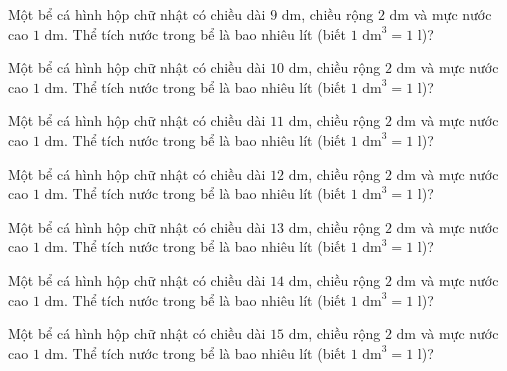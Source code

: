 \begin{ex}
  Một bể cá hình hộp chữ nhật có chiều dài $9\text{ dm}$, chiều rộng $2\text{ dm}$ và mực nước cao $1\text{ dm}$. Thể tích nước trong bể là bao nhiêu lít (biết $1\text{ dm}^3 = 1\text{ l}$)?
\end{ex}

\begin{ex}
  Một bể cá hình hộp chữ nhật có chiều dài $10\text{ dm}$, chiều rộng $2\text{ dm}$ và mực nước cao $1\text{ dm}$. Thể tích nước trong bể là bao nhiêu lít (biết $1\text{ dm}^3 = 1\text{ l}$)?
\end{ex}

\begin{ex}
  Một bể cá hình hộp chữ nhật có chiều dài $11\text{ dm}$, chiều rộng $2\text{ dm}$ và mực nước cao $1\text{ dm}$. Thể tích nước trong bể là bao nhiêu lít (biết $1\text{ dm}^3 = 1\text{ l}$)?
\end{ex}

\begin{ex}
  Một bể cá hình hộp chữ nhật có chiều dài $12\text{ dm}$, chiều rộng $2\text{ dm}$ và mực nước cao $1\text{ dm}$. Thể tích nước trong bể là bao nhiêu lít (biết $1\text{ dm}^3 = 1\text{ l}$)?
\end{ex}

\begin{ex}
  Một bể cá hình hộp chữ nhật có chiều dài $13\text{ dm}$, chiều rộng $2\text{ dm}$ và mực nước cao $1\text{ dm}$. Thể tích nước trong bể là bao nhiêu lít (biết $1\text{ dm}^3 = 1\text{ l}$)?
\end{ex}

\begin{ex}
  Một bể cá hình hộp chữ nhật có chiều dài $14\text{ dm}$, chiều rộng $2\text{ dm}$ và mực nước cao $1\text{ dm}$. Thể tích nước trong bể là bao nhiêu lít (biết $1\text{ dm}^3 = 1\text{ l}$)?
\end{ex}

\begin{ex}
  Một bể cá hình hộp chữ nhật có chiều dài $15\text{ dm}$, chiều rộng $2\text{ dm}$ và mực nước cao $1\text{ dm}$. Thể tích nước trong bể là bao nhiêu lít (biết $1\text{ dm}^3 = 1\text{ l}$)?
\end{ex}

